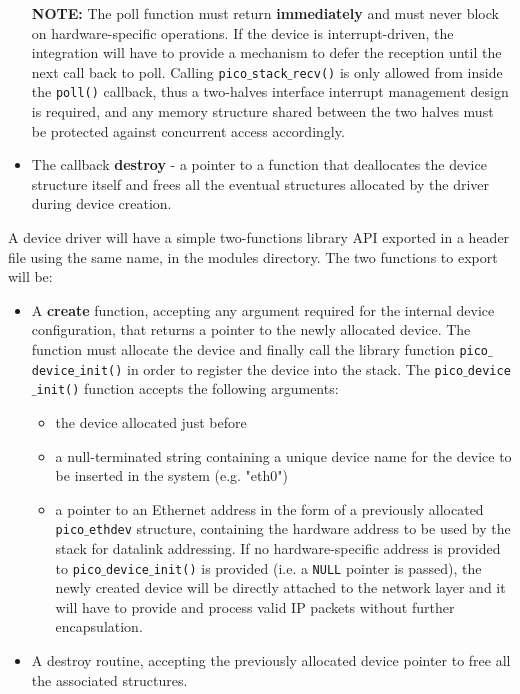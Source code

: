 \begin{itemize}
\textbf{NOTE:} The poll function must return \textbf{immediately} and must never block on
hardware-specific operations. If the device is interrupt-driven, the integration will have
to provide a mechanism to defer the reception until the next call back to poll. Calling
\texttt{pico$\_$stack$\_$recv()} is only allowed from inside the \texttt{poll()} callback,
thus a two-halves interface interrupt management design is required, and any memory structure
shared between the two halves must be protected against concurrent access accordingly.

\item The callback \textbf{destroy} - a pointer to a function that deallocates the device
structure itself and frees all the eventual structures allocated by the driver during device
creation.
\end{itemize}

A device driver will have a simple two-functions library API exported in a header file using
the same name, in the modules directory. The two functions to export will be:

\begin{itemize}
\item A \textbf{create} function, accepting any argument required for the internal device configuration,
that returns a pointer to the newly allocated device. The function must allocate the device and
finally call the library function \texttt{pico$\_$device$\_$init()} in order to register the
device into the stack.
The \texttt{pico$\_$device$\_$init()} function accepts the following arguments:

\begin{itemize}
\item the device allocated just before
\item a null-terminated string containing a unique device name for the device to be inserted in
the system (e.g. "eth0")
\item a pointer to an Ethernet address in the form of a previously allocated \texttt{pico$\_$ethdev}
structure, containing the hardware address to be used by the stack for datalink addressing.
If no hardware-specific address is provided to \texttt{pico$\_$device$\_$init()} is provided
(i.e. a \texttt{NULL} pointer is passed), the newly created device will be directly attached
to the network layer and it will have to provide and process valid IP packets without further
encapsulation.
\end{itemize}

\item A destroy routine, accepting the previously allocated device pointer to free all the associated structures.

\end{itemize}


